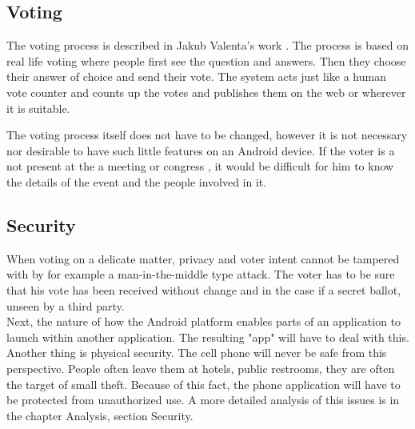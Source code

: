 \documentclass[11pt,twoside,a4paper]{book}
\begin{document}
\subsection{Voting}
The voting process is described in Jakub Valenta's work \cite{bakalarkaJV} . The process is based on real life voting where people first see the question and answers. Then they choose their answer of choice and send their vote. The system acts just like a human vote counter and counts up the votes and publishes them on the web or wherever it is suitable. 


 The voting process itself does not have to be changed, however it is not necessary nor desirable to have such little features on an Android device. If the voter is a not present at the a meeting or congress , it would be difficult for him to know the details of the event and the people involved in it. 





\subsection{Security}
When voting on a delicate matter, privacy and voter intent cannot be tampered with by for example a man-in-the-middle type attack. The voter has to be sure that his vote has been received without change and in the case if a secret ballot, unseen by a third party. \\
Next, the nature of how the Android platform enables parts of an application to launch within another application. The resulting "app" will have to deal with this.\\
Another thing is physical security. The cell phone will never be safe from this perspective. People often leave them at hotels, public restrooms, they are often the target of small theft. Because of this fact, the phone application will have to be protected from unauthorized use. A more detailed analysis of this issues is in the chapter Analysis, section Security.\\
\end{document}
